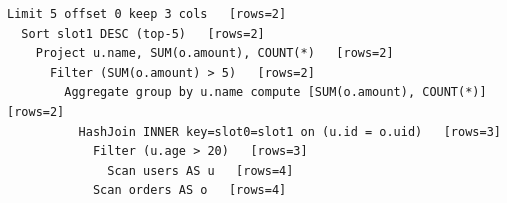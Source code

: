 \begin{lstlisting}[]
Limit 5 offset 0 keep 3 cols   [rows=2]
  Sort slot1 DESC (top-5)   [rows=2]
    Project u.name, SUM(o.amount), COUNT(*)   [rows=2]
      Filter (SUM(o.amount) > 5)   [rows=2]
        Aggregate group by u.name compute [SUM(o.amount), COUNT(*)]   [rows=2]
          HashJoin INNER key=slot0=slot1 on (u.id = o.uid)   [rows=3]
            Filter (u.age > 20)   [rows=3]
              Scan users AS u   [rows=4]
            Scan orders AS o   [rows=4]
\end{lstlisting}
